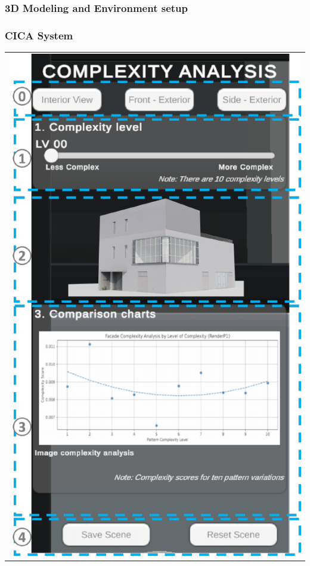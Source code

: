 \documentclass[final,5p,times]{elsarticle}%
\begin{document}
\begin{linenumbers}
    \subsubsection{3D Modeling and Environment setup}
    \label{subsubsec:3DModeling}
    


    \subsubsection{CICA System}
    \label{subsubsec:CICAsystem}
    

    \begin{table}[htb]
        \centering
        \small
        \begin{tabular}{c}
            \begin{minipage}{\textwidth}
                \centering
                  \includegraphics[width= \linewidth]{Images/VRInterface}

\end{minipage}
\end{tabular}
\end{table}
\end{linenumbers}
\end{document}
